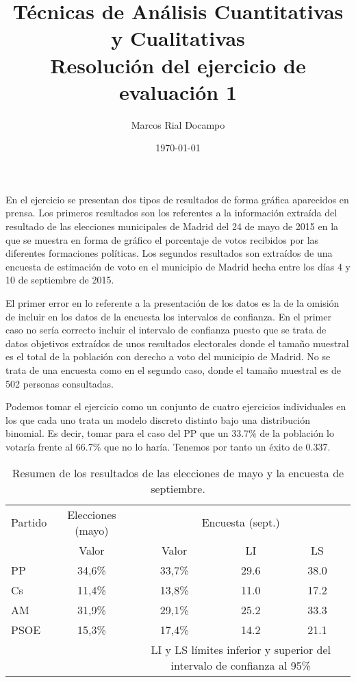 \documentclass[11pt,a4paper]{article}
\author{Marcos Rial Docampo}
\title{Técnicas de Análisis Cuantitativas y Cualitativas\\Resolución del ejercicio de evaluación 1}
\date{\small{\today}}
\begin{document}
\pagestyle{empty}
\maketitle
\thispagestyle{empty}

En el ejercicio se presentan dos tipos de resultados de forma gráfica aparecidos en prensa. Los primeros resultados son los referentes a la información extraída del resultado de las elecciones municipales de Madrid del 24 de mayo de 2015 en la que se muestra en forma de gráfico el porcentaje de votos recibidos por las diferentes formaciones políticas. Los segundos resultados son extraídos de una encuesta de estimación de voto en el municipio de Madrid hecha entre los días 4 y 10 de septiembre de 2015.

El primer error en lo referente a la presentación de los datos es la de la omisión de incluir en los datos de la encuesta los intervalos de confianza. En el primer caso no sería correcto incluir el intervalo de confianza puesto que se trata de datos objetivos extraídos de unos resultados electorales donde el tamaño muestral es el total de la población con derecho a voto del municipio de Madrid. No se trata de una encuesta como en el segundo caso, donde el tamaño muestral es de 502 personas consultadas.

Podemos tomar el ejercicio como un conjunto de cuatro ejercicios individuales en los que cada uno trata un modelo discreto distinto bajo una distribución binomial. Es decir, tomar para el caso del PP que un 33.7\% de la población lo votaría frente al 66.7\% que no lo haría. Tenemos por tanto un éxito de 0.337.

\begin{table}
	\centering
	\caption{Resumen de los resultados de las elecciones de mayo y la encuesta de septiembre.}
	\begin{tabular}{lcccc}
	\toprule[0.4mm]
	Partido & Elecciones (mayo) & \multicolumn{3}{c}{Encuesta (sept.)}\\
	& Valor & Valor & LI & LS \\
	\midrule
	PP & 34,6\% & 33,7\% & 29.6 & 38.0 \\
	Cs & 11,4\% & 13,8\% & 11.0 & 17.2 \\
	AM & 31,9\% & 29,1\% & 25.2 & 33.3 \\
	PSOE & 15,3\% & 17,4\% & 14.2 & 21.1 \\
	\bottomrule[0.4mm]
	& & \multicolumn{3}{p{3.4cm}}{\footnotesize{LI y LS límites inferior y superior del intervalo de confianza al 95\%}}
	\end{tabular}
\end{table}
\end{document}
